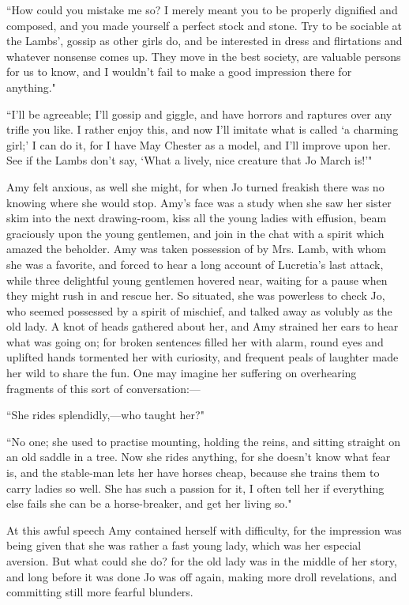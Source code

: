 ``How could you mistake me so? I merely meant you to be properly
dignified and composed, and you made yourself a perfect stock and stone.
Try to be sociable at the Lambs', gossip as other girls
do, and be interested in dress and flirtations and whatever nonsense
comes up. They move in the best society, are valuable persons for us to
know, and I wouldn't fail to make a good impression
there for anything."

``I'll be agreeable; I'll gossip and
giggle, and have horrors and raptures over any trifle you like. I rather
enjoy this, and now I'll imitate what is called
`a charming girl;' I can do it, for I
have May Chester as a model, and I'll improve upon her.
See if the Lambs don't say, `What a
lively, nice creature that Jo March is!'"

Amy felt anxious, as well she might, for when Jo turned freakish there
was no knowing where she would stop. Amy's face was a
study when she saw her sister skim into the next drawing-room, kiss all
the young ladies with effusion, beam graciously upon the young
gentlemen, and join in the chat with a spirit which amazed the beholder.
Amy was taken possession of by Mrs. Lamb, with whom she was a favorite,
and forced to hear a long account of Lucretia's last
attack, while three delightful young gentlemen hovered near, waiting for
a pause when they might rush in and rescue her. So situated, she was
powerless to check Jo, who seemed possessed by a spirit of mischief, and
talked away as volubly as the old lady. A knot of heads gathered about
her, and Amy strained her ears to hear what was going on; for broken
sentences filled her with alarm, round eyes and uplifted hands tormented
her with curiosity, and frequent peals of laughter made her wild to
share the fun. One may imagine her suffering on overhearing fragments of
this sort of conversation:---

``She rides splendidly,---who taught her?"

``No one; she used to practise mounting, holding the reins, and sitting
straight on an old saddle in a tree. Now she rides anything, for she
doesn't know what fear is, and the stable-man lets her
have horses cheap, because she trains them to carry ladies so well. She
has such a passion for it, I often tell her if everything else fails she
can be a horse-breaker, and get her living so."

At this awful speech Amy contained herself with difficulty, for the
impression was being given that she was rather a fast young lady, which
was her especial aversion. But what could she do? for the old lady was
in the middle of her story, and long before it was done Jo was off
again, making more droll revelations, and committing still more fearful
blunders.

